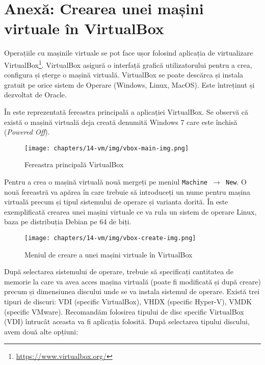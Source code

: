 \section{Anexă: Crearea unei mașini virtuale în VirtualBox}
\label{sec:vm:create-vbox}

Operațiile cu mașinile virtuale se pot face ușor folosind aplicația de
virtualizare VirtualBox\footnote{\url{https://www.virtualbox.org/}}. VirtualBox asigură o interfață grafică utilizatorului
pentru a crea, configura și șterge o mașină virtuală. VirtualBox se poate descărca și instala gratuit pe orice sistem de Operare
(Windows, Linux, MacOS). Este întreținut și dezvoltat de Oracle.

În  este reprezentată fereastra
principală a aplicației VirtualBox. Se observă că există o mașină virtuală deja
creată denumită Windows 7 care este închisă (\textit{Powered Off}).

\begin{figure}[!htbp]
	\centering
	\texttt{[image: chapters/14-vm/img/vbox-main-img.png]}
	\caption{Fereastra principală VirtualBox}
	\label{fig:vm:vbox-main}
\end{figure}

Pentru a crea o mașină virtuală nouă mergeți pe meniul \texttt{Machine $\rightarrow$ New}. O nouă
fereastră va apărea în care trebuie să introduceți un nume pentru mașina
virtuală precum și tipul sistemului de operare și varianta dorită. În
 este exemplificată crearea unei
mașini virtuale ce va rula un sistem de operare Linux, baza pe distribuția
Debian pe 64 de biți.

\begin{figure}[!htbp]
	\centering
	\texttt{[image: chapters/14-vm/img/vbox-create-img.png]}
	\caption{Meniul de creare a unei mașini virtuale în VirtualBox}
	\label{fig:vm:vbox-create}
\end{figure}

După selectarea sistemului de operare, trebuie să specificați cantitatea de
memorie la care va avea acces mașina virtuală (poate fi modificată și după
creare) precum și dimensiunea discului unde se va instala sistemul de operare.
Există trei tipuri de discuri: VDI (specific VirtualBox), VHDX (specific
Hyper-V), VMDK (specific VMware). Recomandăm folosirea tipului de disc specific
VirtualBox (VDI) întrucât aceasta va fi aplicația folosită. După selectarea
tipului discului, avem două alte opțiuni:

